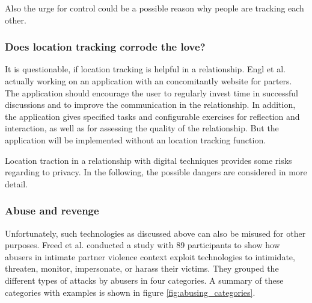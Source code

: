 Also the urge for control could be a possible reason why people are tracking each other.

\subsubsection{Does location tracking corrode the love?}
It is questionable, if location tracking is helpful in a relationship.
Engl et al. \cite{engl2016} actually working on an application with an concomitantly website for parters.
The application should encourage the user to regularly invest time in successful discussions and to improve the communication in the relationship.
In addition, the application gives specified tasks and configurable exercises for reflection and interaction, as well as for assessing the quality of the relationship.
But the application will be implemented without an location tracking function.


Location traction in a relationship with digital techniques provides some risks regarding to privacy. In the following, the possible dangers are considered in more detail.

\subsubsection{Abuse and revenge}
Unfortunately, such technologies as discussed above can also be misused for other purposes. Freed et al. \cite{freed2018stalker} conducted a study with 89 participants to show how abusers in intimate partner violence context exploit technologies to intimidate, threaten, monitor, impersonate, or harass their victims.
They grouped the different types of attacks by abusers in four categories. A summary of these categories with examples is shown in figure \ref{fig:abusing_categories}.

